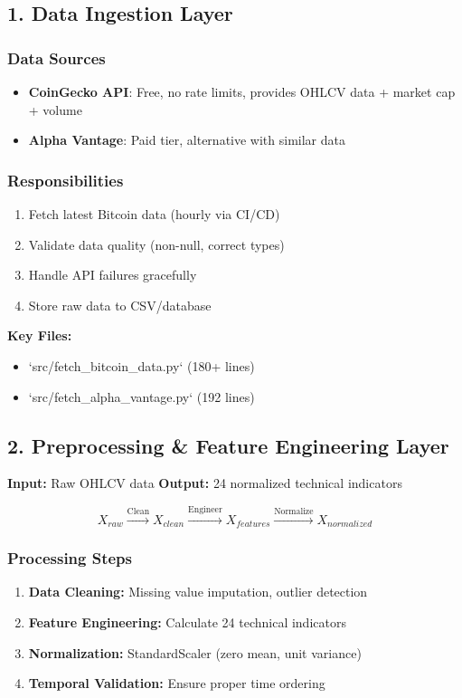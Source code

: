 \subsection{1. Data Ingestion Layer}

\subsubsection{Data Sources}
\begin{itemize}
    \item \textbf{CoinGecko API}: Free, no rate limits, provides OHLCV data + market cap + volume
    \item \textbf{Alpha Vantage}: Paid tier, alternative with similar data
\end{itemize}

\subsubsection{Responsibilities}
\begin{enumerate}
    \item Fetch latest Bitcoin data (hourly via CI/CD)
    \item Validate data quality (non-null, correct types)
    \item Handle API failures gracefully
    \item Store raw data to CSV/database
\end{enumerate}

\textbf{Key Files:}
\begin{itemize}
    \item `src/fetch\_bitcoin\_data.py` (180+ lines)
    \item `src/fetch\_alpha\_vantage.py` (192 lines)
\end{itemize}

\subsection{2. Preprocessing \& Feature Engineering Layer}

\textbf{Input:} Raw OHLCV data  
\textbf{Output:} 24 normalized technical indicators

\begin{equation}
X_{raw} \xrightarrow{\text{Clean}} X_{clean} \xrightarrow{\text{Engineer}} X_{features} \xrightarrow{\text{Normalize}} X_{normalized}
\end{equation}

\subsubsection{Processing Steps}
\begin{enumerate}
    \item \textbf{Data Cleaning:} Missing value imputation, outlier detection
    \item \textbf{Feature Engineering:} Calculate 24 technical indicators
    \item \textbf{Normalization:} StandardScaler (zero mean, unit variance)
    \item \textbf{Temporal Validation:} Ensure proper time ordering
\end{enumerate}

